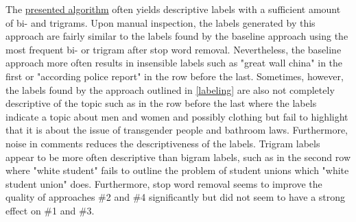 The \hyperref[labeling]{presented algorithm} often yields descriptive labels with a sufficient amount of bi- and trigrams. Upon manual inspection, the labels generated by this approach are fairly similar to the labels found by the baseline approach using the most frequent bi- or trigram after stop word removal. Nevertheless, the baseline approach more often results in insensible labels such as "great wall china" in the first or "according police report" in the row before the last. Sometimes, however, the labels found by the approach outlined in \autoref{labeling} are also not completely descriptive of the topic such as in the row before the last where the labels indicate a topic about men and women and possibly clothing but fail to highlight that it is about the issue of transgender people and bathroom laws. Furthermore, noise in comments reduces the descriptiveness of the labels. Trigram labels appear to be more often descriptive than bigram labels, such as in the second row where "white student" fails to outline the problem of student unions which "white student union" does.
Furthermore, stop word removal seems to improve the quality of approaches \#2 and \#4 significantly but did not seem to have a strong effect on \#1 and \#3.


